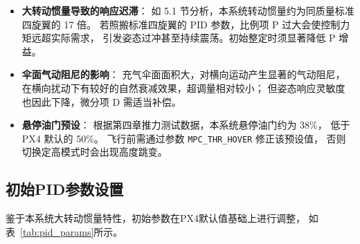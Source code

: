 \begin{itemize}
    \item \textbf{大转动惯量导致的响应迟滞}：
          如 5.1 节分析，本系统转动惯量约为同质量标准四旋翼的 17 倍。
          若照搬标准四旋翼的 PID 参数，比例项 P 过大会使控制力矩远超实际需求，
          引发姿态过冲甚至持续震荡。初始整定时须显著降低 P 增益。

    \item \textbf{伞面气动阻尼的影响}：
          充气伞面面积大，对横向运动产生显著的气动阻尼，
          在横向扰动下有较好的自然衰减效果，超调量相对较小；
          但姿态响应灵敏度也因此下降，微分项 D 需适当补偿。

    \item \textbf{悬停油门预设}：
          根据第四章推力测试数据，本系统悬停油门约为 38\%，
          低于 PX4 默认的 50\%。
          飞行前需通过参数 \texttt{MPC\_THR\_HOVER} 修正该预设值，
          否则切换定高模式时会出现高度跳变。
\end{itemize}

\subsection{初始PID参数设置}

鉴于本系统大转动惯量特性，初始参数在PX4默认值基础上进行调整，
如表~\ref{tab:pid_params}所示。

